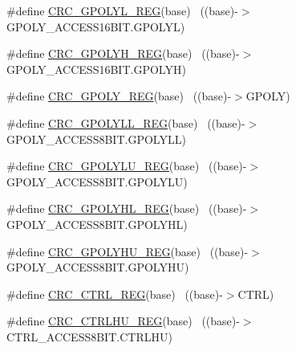 \begin{DoxyCompactItemize}
\item 
\#define \hyperlink{group___c_r_c___register___accessor___macros_gab1698faf3a8970f99f403444ebb4d2c8}{C\+R\+C\+\_\+\+G\+P\+O\+L\+Y\+L\+\_\+\+R\+EG}(base)                                      ~((base)-\/$>$G\+P\+O\+L\+Y\+\_\+\+A\+C\+C\+E\+S\+S16\+B\+I\+T.\+G\+P\+O\+L\+YL)
\item 
\#define \hyperlink{group___c_r_c___register___accessor___macros_gafad4f84e32d790a7fe24cd92b2c480dd}{C\+R\+C\+\_\+\+G\+P\+O\+L\+Y\+H\+\_\+\+R\+EG}(base)                                      ~((base)-\/$>$G\+P\+O\+L\+Y\+\_\+\+A\+C\+C\+E\+S\+S16\+B\+I\+T.\+G\+P\+O\+L\+YH)
\item 
\#define \hyperlink{group___c_r_c___register___accessor___macros_ga4380a8ebc7eff991b5db31a826e12c34}{C\+R\+C\+\_\+\+G\+P\+O\+L\+Y\+\_\+\+R\+EG}(base)                                        ~((base)-\/$>$G\+P\+O\+LY)
\item 
\#define \hyperlink{group___c_r_c___register___accessor___macros_gaf49775745cf42c0370512f2c0058acd7}{C\+R\+C\+\_\+\+G\+P\+O\+L\+Y\+L\+L\+\_\+\+R\+EG}(base)                                    ~((base)-\/$>$G\+P\+O\+L\+Y\+\_\+\+A\+C\+C\+E\+S\+S8\+B\+I\+T.\+G\+P\+O\+L\+Y\+LL)
\item 
\#define \hyperlink{group___c_r_c___register___accessor___macros_ga1ad8ace74d9ab86940dfd4d066635b1c}{C\+R\+C\+\_\+\+G\+P\+O\+L\+Y\+L\+U\+\_\+\+R\+EG}(base)                                    ~((base)-\/$>$G\+P\+O\+L\+Y\+\_\+\+A\+C\+C\+E\+S\+S8\+B\+I\+T.\+G\+P\+O\+L\+Y\+LU)
\item 
\#define \hyperlink{group___c_r_c___register___accessor___macros_gac5b8db04ab62b0ea728987e54a9aab93}{C\+R\+C\+\_\+\+G\+P\+O\+L\+Y\+H\+L\+\_\+\+R\+EG}(base)                                    ~((base)-\/$>$G\+P\+O\+L\+Y\+\_\+\+A\+C\+C\+E\+S\+S8\+B\+I\+T.\+G\+P\+O\+L\+Y\+HL)
\item 
\#define \hyperlink{group___c_r_c___register___accessor___macros_ga1692656f77c7ec2de5c561f84e5811b2}{C\+R\+C\+\_\+\+G\+P\+O\+L\+Y\+H\+U\+\_\+\+R\+EG}(base)                                    ~((base)-\/$>$G\+P\+O\+L\+Y\+\_\+\+A\+C\+C\+E\+S\+S8\+B\+I\+T.\+G\+P\+O\+L\+Y\+HU)
\item 
\#define \hyperlink{group___c_r_c___register___accessor___macros_gaf046fbac123e09bad1bf8238974247c5}{C\+R\+C\+\_\+\+C\+T\+R\+L\+\_\+\+R\+EG}(base)                                          ~((base)-\/$>$C\+T\+RL)
\item 
\#define \hyperlink{group___c_r_c___register___accessor___macros_ga680ec9b0b037687ce6b43e13d72599a5}{C\+R\+C\+\_\+\+C\+T\+R\+L\+H\+U\+\_\+\+R\+EG}(base)                                      ~((base)-\/$>$C\+T\+R\+L\+\_\+\+A\+C\+C\+E\+S\+S8\+B\+I\+T.\+C\+T\+R\+L\+HU)

\end{DoxyCompactItemize}
